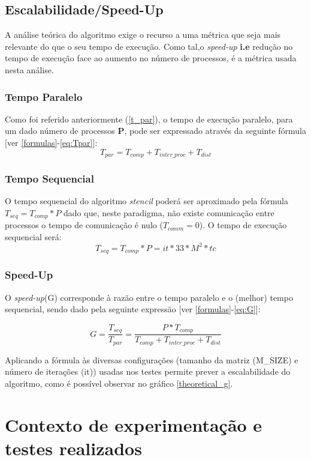 \documentclass{article}
\begin{document}
\subsection{Escalabilidade/Speed-Up}
A análise teórica do algoritmo exige o recurso a uma métrica que seja mais relevante do
que o seu tempo de execução. Como tal,o \textit{speed-up} \textbf{i.e}
redução no tempo de execução face ao aumento no número de processos, é a métrica usada
nesta análise.

\subsubsection{Tempo Paralelo}
Como foi referido anteriormente (\ref{t_par}), o tempo de execução paralelo, para um 
dado número de processos \textbf{P}, pode ser expressado através da seguinte fórmula [ver \ref{formulas}-\ref{eq:Tpar}]:
$$T_{par} = T_{comp} + T_{inter\_proc} + T_{dist}$$

\subsubsection{Tempo Sequencial}
O tempo sequencial do algoritmo \textit{stencil} poderá ser aproximado pela fórmula
$T_{seq}=T_{comp}*P$ dado que, neste paradigma, não existe comunicação entre processos o tempo de comunicação é nulo ($T_{comm}=0$).
O tempo de execução sequencial será: 
$$T_{seq} = T_{comp}*P = it*33*M^2*tc$$

\subsubsection{Speed-Up}
O \textit{speed-up}(G) corresponde à razão entre o tempo paralelo e o (melhor) tempo sequencial,
sendo dado pela seguinte expressão [ver \ref{formulas}-\ref{eq:G}]:

$$G=\frac{T_{seq}}{T_{par}} = \frac{P*T_{comp}}{T_{comp} + T_{inter\_proc} + T_{dist}}$$

Aplicando a fórmula às diversas configurações (tamanho da matriz (M\_SIZE) e número de iterações
(it)) usadas nos testes permite prever a escalabilidade do algoritmo, como é possível observar
no gráfico \ref{theoretical_g}.

\section{Contexto de experimentação e testes realizados} \label{context}
\end{document}
